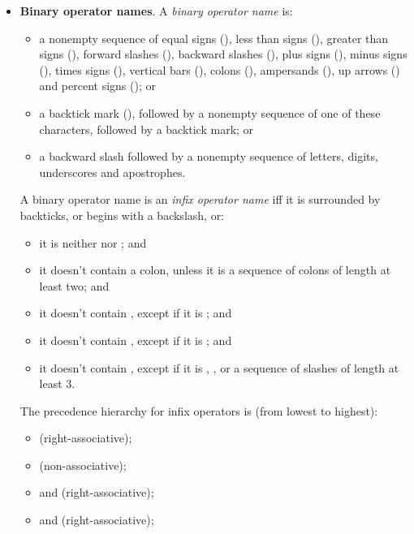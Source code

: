\begin{itemize}
\item \textbf{Binary operator names}. A \emph{binary operator name}
  is:
  \begin{itemize}
  \item a nonempty sequence of equal signs (\ec{=}), less
  than signs (\ec{<}), greater than signs (\ec{>}), forward slashes
  (\ec{/}), backward slashes (\ec{\\}), plus signs (\ec{+}), minus
  signs (\ec{-}), times signs (\ec{*}), vertical bars (\ec{|}), colons
  (\ec{:}), ampersands (\ec{&}), up arrows (\ec{^}) and percent signs
  (\ec{\%}); or

  \item a backtick mark (), followed by a nonempty sequence of one
    of these characters, followed by a backtick mark; or

  \item a backward slash followed by a nonempty sequence of letters,
    digits, underscores and apostrophes.
  \end{itemize}

  A binary operator name is an \emph{infix operator name} iff it is
  surrounded by backticks, or begins with a backslash, or:
  \begin{itemize}
  \item it is neither \ecn{<<} nor \ecn{>>}; and
  \item it doesn't contain a colon, unless it is a sequence of colons
    of length at least two; and
  \item it doesn't contain \ecn{=>}, except if it is \ecn{=>}; and
  \item it doesn't contain \ecn{|}, except if it is \ecn{||}; and
  \item it doesn't contain \ecn{/}, except if it is \ecn{/},
    \ecn{/\\}, or a sequence of slashes of length at least 3.
  \end{itemize}

  The precedence hierarchy for infix operators is (from lowest to highest):
  \begin{itemize}
  \item \ecn{=>} (right-associative);

  \item \ecn{<=>} (non-associative);

  \item \ecn{||} and \ecn{\\/} (right-associative);

  \item \ecn{&&} and \ecn{/\\} (right-associative);


\end{itemize}
\end{itemize}
